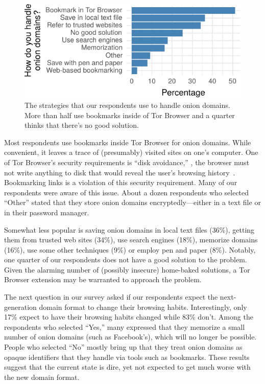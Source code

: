 \begin{figure}[t]
    \centering
    \includegraphics[width=\linewidth]{figures/onion-domain-mgmt.pdf}
    \caption{The strategies that our respondents use to handle onion domains.
    More than half use bookmarks inside of Tor Browser and a quarter thinks that
    there's no good solution.}
    \label{fig:onion-domain-mgmt}
\end{figure}

Most respondents use bookmarks inside Tor Browser for onion domains.  While
convenient, it leaves a trace of (presumably) visited sites on one's computer.
One of Tor Browser's security requirements is ``disk avoidance,'' \ie, the
browser must not write anything to disk that would reveal the user's browsing
history~\cite[\S~2.1]{Perry2017a}.  Bookmarking links is a violation of this
security requirement.  Many of our respondents were aware of this issue.  About
a dozen respondents who selected ``Other'' stated that they store onion domains
encryptedly---either in a text file or in their password manager.

Somewhat less popular is saving onion domains in local text files (36\%),
getting them from trusted web sites (34\%), use search engines (18\%), memorize
domains (16\%), use some other techniques (9\%) or employ pen and paper (8\%).
Notably, one quarter of our respondents does not have a good solution to the
problem.  Given the alarming number of (possibly insecure) home-baked solutions,
a Tor Browser extension may be warranted to approach the problem.

The next question in our survey asked if our respondents expect the
next-generation domain format to change their browsing habits.  Interestingly,
only 17\% expect to have their browsing habits changed while 83\% don't.  Among
the respondents who selected ``Yes,'' many expressed that they memorize a small
number of onion domains (such as Facebook's), which will no longer be possible.
People who selected ``No'' mostly bring up that they treat onion domains as
opaque identifiers that they handle via tools such as bookmarks.  These results
suggest that the current state is dire, yet not expected to get much worse with
the new domain format.

